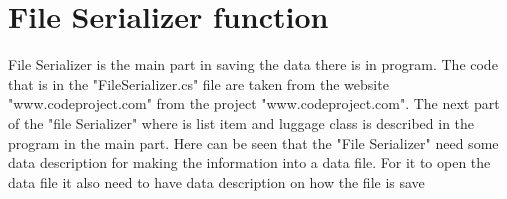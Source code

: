 \section{File Serializer function}
File Serializer is the main part in saving the data there is in program. The code that is in the "FileSerializer.cs" file are taken from the website "www.codeproject.com" from the project "www.codeproject.com". The next part of the "file Serializer" where is list item and luggage class is described in the program in the main part.
Here can be seen that the "File Serializer" need some data description for making the information into a data file.
For it to open the data file it also need to have data description on how the file is save